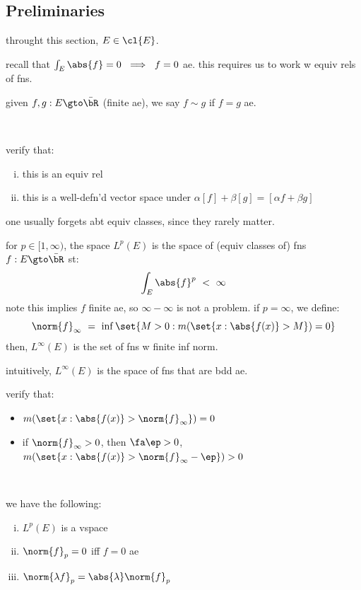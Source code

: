 \subsection{Preliminaries}

throught this section, $E\in\cl{E}$.

recall that $\int_{E}\abs{f}=0 \ \implies \ f=0$ ae.
this requires us to work w equiv rels of fns.

\begin{defn}
	given $f,g:E\gto\bar{\bR}$ (finite ae), we say $f\sim g$ if $f=g$ ae.
\end{defn} \

\begin{exr}
	verify that:
	\begin{enumerate}[i)]
		\item this is an equiv rel
		\item this is a well-defn'd vector space under $\alpha[f]+\beta[g]=[\alpha f+\beta g]$
	\end{enumerate}
\end{exr}
one usually forgets abt equiv classes, since they rarely matter.

\begin{defn}
	for $p\in[1,\infty)$, the space $L^{p}(E)$ is the space of
	(equiv classes of) fns $f:E\gto\bar{\bR}$ st:
	\begin{equation*}
		\int_{E}\abs{f}^{p} \ < \ \infty
	\end{equation*}
	note this implies $f$ finite ae, so $\infty-\infty$ is not a problem.
	if $p=\infty$, we define:
	\begin{equation*}
		\norm{f}_{\infty} \ = \ \inf\set{M>0:m(\set{x:\abs{f(x)}>M})=0}
	\end{equation*}
	then, $L^{\infty}(E)$ is the set of fns w finite inf norm.
\end{defn}
intuitively, $L^{\infty}(E)$ is the space of fns that are bdd ae.

\begin{exr}
	verify that:
	\begin{itemize}
		\item $m(\set{x:\abs{f(x)}>\norm{f}_{\infty}})=0$
		\item if $\norm{f}_{\infty}>0$, then $\fa\ep>0$,
			$m(\set{x:\abs{f(x)}>\norm{f}_{\infty}-\ep})>0$
	\end{itemize}
\end{exr} \

\begin{prop}
	we have the following:
	\begin{enumerate}[i)]
		\item $L^{p}(E)$ is a vspace
		\item $\norm{f}_{p}=0$ iff $f=0$ ae
		\item $\norm{\lambda f}_{p}=\abs{\lambda}\norm{f}_{p}$
	\end{enumerate}
\end{prop} \

